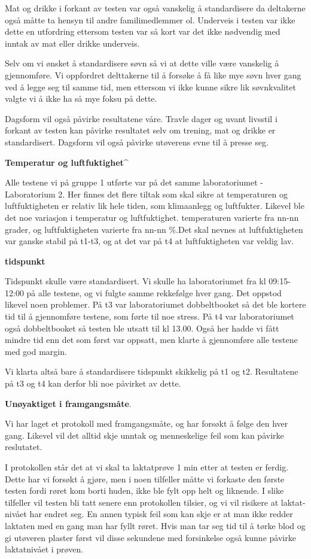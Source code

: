 \documentclass[
  letterpaper,
  DIV=11,
  numbers=noendperiod]{scrreprt}
\begin{document}
Mat og drikke i forkant av testen var også vanskelig å standardisere da
deltakerne også måtte ta hensyn til andre familimedlemmer ol. Underveis
i testen var ikke dette en utfordring ettersom testen var så kort var
det ikke nødvendig med inntak av mat eller drikke underveis.

Selv om vi ønsket å standardisere søvn så vi at dette ville være
vanskelig å gjennomføre. Vi oppfordret delttakerne til å forsøke å få
like mye søvn hver gang ved å legge seg til samme tid, men ettersom vi
ikke kunne sikre lik søvnkvalitet valgte vi å ikke ha så mye foksu på
dette.

Dagsform vil også påvirke resultatene våre. Travle dager og uvant
livsstil i forkant av testen kan påvirke resultatet selv om trening, mat
og drikke er standardisert. Dagsform vil også påvirke utøverens evne til
å presse seg.

\textbf{Temperatur og luftfuktighet\^{}}

Alle testene vi på gruppe 1 utførte var på det samme laboratoriumet -
Laboratorium 2. Her finnes det flere tiltak som skal sikre at
temperaturen og luftfuktigheten er relativ lik hele tiden, som
klimaanlegg og luftfukter. Likevel ble det noe variasjon i temperatur og
luftfuktighet. temperaturen varierte fra nn-nn grader, og
luftfuktigheten varierte fra nn-nn \%.Det skal nevnes at luftfuktigheten
var ganske stabil på t1-t3, og at det var på t4 at luftfuktigheten var
veldig lav.

\textbf{tidspunkt}

Tidspunkt skulle være standardisert. Vi skulle ha laboratoriumet fra kl
09:15-12:00 på alle testene, og vi fulgte samme rekkefølge hver gang.
Det oppstod likevel noen problemer. På t3 var laboratoriumet
dobbeltbooket så det ble kortere tid til å gjennomføre testene, som
førte til noe stress. På t4 var laboratoriumet også dobbeltbooket så
testen ble utsatt til kl 13.00. Også her hadde vi fått mindre tid enn
det som først var oppsatt, men klarte å gjennomføre alle testene med god
margin.

Vi klarta altså bare å standardisere tidspunkt skikkelig på t1 og t2.
Resultatene på t3 og t4 kan derfor bli noe påvirket av dette.

\textbf{Unøyaktiget i framgangsmåte}.

Vi har laget et protokoll med framgangsmåte, og har forsøkt å følge den
hver gang. Likevel vil det alltid skje unntak og menneskelige feil som
kan påvirke reslutatet.

I protokollen står det at vi skal ta laktatprøve 1 min etter at testen
er ferdig. Dette har vi forsøkt å gjøre, men i noen tilfeller måtte vi
forkaste den første testen fordi røret kom borti huden, ikke ble fylt
opp helt og liknende. I slike tilfeller vil testen bli tatt senere enn
protokollen tilsier, og vi vil risikere at laktat-nivået har endret seg.
En annen typisk feil som kan skje er at man ikke redder laktaten med en
gang man har fyllt røret. Hvis man tar seg tid til å tørke blod og gi
utøveren plaster først vil disse sekundene med forsinkelse også kunne
påvirke laktatnivået i prøven.
\end{document}
